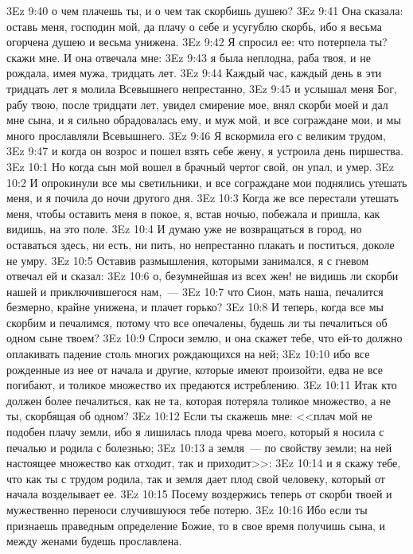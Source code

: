 \vs 3Ez 9:40 о чем плачешь ты, и о чем так скорбишь душею?
\vs 3Ez 9:41 Она сказала: оставь меня, господин мой, да плачу о себе и усугублю скорбь, ибо я весьма огорчена душею и весьма унижена.
\vs 3Ez 9:42 Я спросил ее: что потерпела ты? скажи мне. И она отвечала мне:
\vs 3Ez 9:43 я была неплодна, раба твоя, и не рождала, имея мужа, тридцать лет.
\vs 3Ez 9:44 Каждый час, каждый день в эти тридцать лет я молила Всевышнего непрестанно,
\vs 3Ez 9:45 и услышал меня Бог, рабу твою, после тридцати лет, увидел смирение мое, внял скорби моей и дал мне сына, и я сильно обрадовалась ему, и муж мой, и все сограждане мои, и мы много прославляли Всевышнего.
\vs 3Ez 9:46 Я вскормила его с великим трудом,
\vs 3Ez 9:47 и когда он возрос и пошел взять себе жену, я устроила день пиршества.
\vs 3Ez 10:1 Но когда сын мой вошел в брачный чертог свой, он упал, и умер.
\vs 3Ez 10:2 И опрокинули все мы светильники, и все сограждане мои поднялись утешать меня, и я почила до ночи другого дня.
\vs 3Ez 10:3 Когда же все перестали утешать меня, чтобы оставить меня в покое, я, встав ночью, побежала и пришла, как видишь, на это поле.
\vs 3Ez 10:4 И думаю уже не возвращаться в город, но оставаться здесь, ни есть, ни пить, но непрестанно плакать и поститься, доколе не умру.
\vs 3Ez 10:5 Оставив размышления, которыми занимался, я с гневом отвечал ей и сказал:
\vs 3Ez 10:6 о, безумнейшая из всех жен! не видишь ли скорби нашей и приключившегося нам,~---
\vs 3Ez 10:7 что Сион, мать наша, печалится безмерно, крайне унижена, и плачет горько?
\vs 3Ez 10:8 И теперь, когда все мы скорбим и печалимся, потому что все опечалены, будешь ли ты печалиться об одном сыне твоем?
\vs 3Ez 10:9 Спроси землю, и она скажет тебе, что ей-то должно оплакивать падение столь многих рождающихся на ней;
\vs 3Ez 10:10 ибо все рожденные из нее от начала и другие, которые имеют произойти, едва не все погибают, и толикое множество их предаются истреблению.
\vs 3Ez 10:11 Итак кто должен более печалиться, как не та, которая потеряла толикое множество, а не ты, скорбящая об одном?
\vs 3Ez 10:12 Если ты скажешь мне: <<плач мой не подобен плачу земли, ибо я лишилась плода чрева моего, который я носила с печалью и родила с болезнью;
\vs 3Ez 10:13 а земля~--- по свойству земли; на ней настоящее множество как отходит, так и приходит>>:
\vs 3Ez 10:14 и я скажу тебе, что как ты с трудом родила, так и земля дает плод свой человеку, который от начала возделывает ее.
\vs 3Ez 10:15 Посему воздержись теперь от скорби твоей и мужественно переноси случившуюся тебе потерю.
\vs 3Ez 10:16 Ибо если ты признаешь праведным определение Божие, то в свое время получишь сына, и между женами будешь прославлена.
